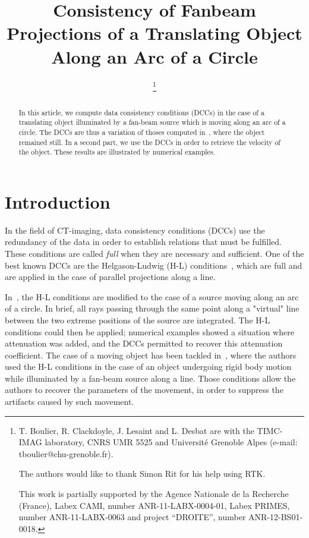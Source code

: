 \documentclass[twocolumn]{IEEEtran}
\title{Consistency of Fanbeam Projections of a Translating Object Along an Arc of a Circle}
\date{}
\numberwithin{equation}{section}
\begin{document}
\author{
	\thanks{T. Boulier, R. Clackdoyle, J. Lesaint and L. Desbat are with the TIMC-IMAG laboratory, CNRS UMR 5525 and Universit\'e Grenoble Alpes (e-mail: tboulier@chu-grenoble.fr).

	The authors would like to thank Simon Rit for his help using RTK.
			
	This work is partially supported by the Agence Nationale de la Recherche (France), Labex CAMI, number ANR-11-LABX-0004-01, Labex PRIMES, number ANR-11-LABX-0063 and project ``DROITE'', number ANR-12-BS01-0018.
}		
\IEEEauthorblockA{}
}

\maketitle

\begin{abstract}
In this article, we compute data consistency conditions (DCCs) in the case of a translating object illuminated by a fan-beam source which is moving along an arc of a circle. The DCCs are thus a variation of thoses computed in~\cite{clackdoyle2015consistency}, where the object remained still. In a second part, we use the DCCs in order to retrieve the velocity of the object. These results are illustrated by numerical examples.
\end{abstract}

\section{Introduction}

In the field of CT-imaging, data consistency conditions (DCCs) use the redundancy of the data in order to establish relations that must be fulfilled. These conditions are called \emph{full} when they are necessary and sufficient. One of the best known DCCs are the Helgason-Ludwig (H-L) conditions~\cite{helgason1980radon,ludwig1966radon}, which are full and are applied in the case of parallel projections along a line.

In~\cite{clackdoyle2015consistency}, the H-L conditions are modified to the case of a source moving along an arc of a circle. In brief, all rays passing through the same point along a "virtual" line between the two extreme positions of the source are integrated. The H-L conditions could then be applied; numerical examples showed a situation where attenuation was added, and the DCCs permitted to recover this attenuation coefficient. The case of a moving object has been tackled in~\cite{yu2006data,yu2007data}, where the authors used the H-L conditions in the case of an object undergoing rigid body motion while illuminated by a fan-beam source along a line. Those conditions allow the authors to recover the parameters of the movement, in order to suppress the artifacts caused by such movement.
\end{document}
